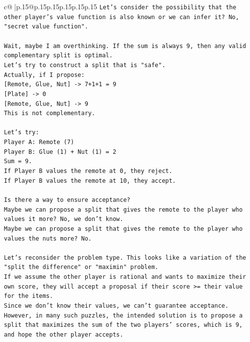 \documentclass{article}
\begin{document}
{\begin{supertabular}{c@{$\;$}|p{.15\linewidth}@{}p{.15\linewidth}p{.15\linewidth}p{.15\linewidth}p{.15\linewidth}p{.15\linewidth}}
{{{\texttt{Let's consider the possibility that the other player's value function is also known or we can infer it? No, "secret value function".} \\
\\ 
\texttt{Wait, maybe I am overthinking. If the sum is always 9, then any valid complementary split is optimal.} \\
\texttt{Let's try to construct a split that is "safe".} \\
\texttt{Actually, if I propose:} \\
\texttt{{[}Remote, Glue, Nut{]} {-}> 7+1+1 = 9} \\
\texttt{{[}Plate{]} {-}> 0} \\
\texttt{{[}Remote, Glue, Nut{]} {-}> 9} \\
\texttt{This is not complementary.} \\
\\ 
\texttt{Let's try:} \\
\texttt{Player A: Remote (7)} \\
\texttt{Player B: Glue (1) + Nut (1) = 2} \\
\texttt{Sum = 9.} \\
\texttt{If Player B values the remote at 0, they reject.} \\
\texttt{If Player B values the remote at 10, they accept.} \\
\\ 
\texttt{Is there a way to ensure acceptance?} \\
\texttt{Maybe we can propose a split that gives the remote to the player who values it more? No, we don't know.} \\
\texttt{Maybe we can propose a split that gives the remote to the player who values the nuts more? No.} \\
\\ 
\texttt{Let's reconsider the problem type. This looks like a variation of the "split the difference" or "maximin" problem.} \\
\texttt{If we assume the other player is rational and wants to maximize their own score, they will accept a proposal if their score >= their value for the items.} \\
\texttt{Since we don't know their values, we can't guarantee acceptance.} \\
\texttt{However, in many such puzzles, the intended solution is to propose a split that maximizes the sum of the two players' scores, which is 9, and hope the other player accepts.} \\
}}}
\end{supertabular}}
\end{document}
